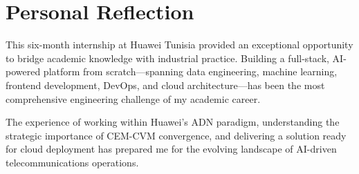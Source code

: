 \section{Personal Reflection}

This six-month internship at Huawei Tunisia provided an exceptional opportunity to bridge academic knowledge with industrial practice. Building a full-stack, AI-powered platform from scratch---spanning data engineering, machine learning, frontend development, DevOps, and cloud architecture---has been the most comprehensive engineering challenge of my academic career.

The experience of working within Huawei's ADN paradigm, understanding the strategic importance of CEM-CVM convergence, and delivering a solution ready for cloud deployment has prepared me for the evolving landscape of AI-driven telecommunications operations.

